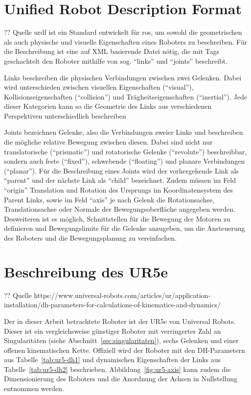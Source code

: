\section{Unified Robot Description Format}\label{sec:urdf}

?? Quelle
\ac{urdf} ist ein Standard entwickelt für \ac{ros}, um sowohl die geometrischen als auch physische und visuelle Eigenschaften eines Roboters zu beschreiben.
Für die Beschreibung ist eine auf XML basierende Datei nötig, die mit Tags geschachtelt den Roboter mithilfe von sog. \enquote{links} und \enquote{joints} beschreibt.

Links beschreiben die physischen Verbindungen zwischen zwei Gelenken.
Dabei wird unterschieden zwischen visuellen Eigenschaften (\enquote{visual}), Kollisionseigenschaften (\enquote{collision}) und Trägheitseigenschaften (\enquote{inertial}).
Jede dieser Kategorien kann so die Geometrie des Links aus verschiedenen Perspektiven unterschiedlich beschreiben

Joints bezeichnen Gelenke, also die Verbindungen zweier Links und beschreiben die mögliche relative Bewegung zwischen diesen.
Dabei sind nicht nur translatorische (\enquote{prismatic}) und rotatorische Gelenke (\enquote{revolute}) beschreibbar, sondern auch feste (\enquote{fixed}), schwebende (\enquote{floating}) und planare Verbindungen (\enquote{planar}).
Für die Beschreibung eines Joints wird der vorhergehende Link als \enquote{parent} und der nächste Link als \enquote{child} bezeichnet.
Zudem müssen im Feld \enquote{origin} Translation und Rotation des Ursprungs im Koordinatensystem des Parent Links, sowie im Feld \enquote{axis} je nach Gelenk die Rotationsachse, Translationsachse oder Normale der Bewegungsoberfläche angegeben werden.
Desweiteren ist es möglich, Schnittstellen für die Bewegung der Motoren zu definieren und Bewegungslimits für die Gelenke anzugeben, um die Ansteuerung des Roboters und die Bewegungsplanung zu vereinfachen.


\section{Beschreibung des UR5e}\label{sec:ur5-in-dh}
?? Quelle https://www.universal-robots.com/articles/ur/application-installation/dh-parameters-for-calculations-of-kinematics-and-dynamics/

Der in dieser Arbeit betrachtete Roboter ist der UR5e von Universal Robots.
Dieser ist ein vergleichsweise günstiger Roboter mit verringerter Zahl an Singularitäten (siehe Abschnitt~\ref{sec:singularitaten}), sechs Gelenken und einer offenen kinematischen Kette.
Offiziell wird der Roboter mit den DH-Parametern aus Tabelle~\ref{tab:ur5-dh1} und dynamischen Eigenschaften der Links aus Tabelle~\ref{tab:ur5-dh2} beschrieben.
Abbildung~\ref{fig:ur5-axis} kann zudem die Dimensionierung des Roboters und die Anordnung der Achsen in Nullstellung entnommen werden.

